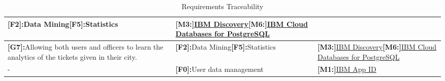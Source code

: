 \begin{table}[htp]
\begin{center}
\begin{tabular}{|p{5cm}|p{5cm}|p{5cm}|}
\textbf{[F2]:}Data Mining\newline\textbf{[F5]:}Statistics&
\textbf{[M3:]}\hyperlink{discovery}{IBM Discovery}\newline\textbf{[M6:]}\hyperlink{postgres}{IBM Cloud Databases for PostgreSQL}\\
\hline
\textbf{[G7]:}Allowing both users and officers to learn the analytics of the tickets given in their city.
&
\textbf{[F2]:}Data Mining\newline\textbf{[F5]:}Statistics&
\textbf{[M3:]}\hyperlink{discovery}{IBM Discovery}\newline\textbf{[M6:]}\hyperlink{postgres}{IBM Cloud Databases for PostgreSQL}\\
\hline
-&\textbf{[F0]:}User data management&\textbf{[M1:]}\hyperlink{appid}{IBM App ID}\\
\hline
\end{tabular}
\end{center}
\caption{Requirements Traceability} 

\end{table}